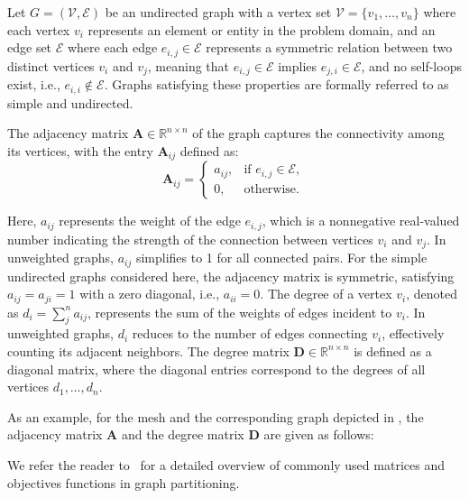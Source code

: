     Let $G=(\mathcal{V}, \mathcal{E})$ be an undirected graph with a vertex set 
    $\mathcal{V}=\{ v_1, \dots, v_n \}$ where each vertex $v_i$ represents
    an element or entity in the problem domain, and an edge set $\mathcal{E}$
    where each edge $e_{i, j} \in \mathcal{E}$ represents a symmetric relation between
    two distinct vertices $v_i$ and $v_j$, meaning that
    $e_{i, j} \in \mathcal{E}$ implies $e_{j, i} \in \mathcal{E}$, and no self-loops exist, i.e., $e_{i, i} \notin \mathcal{E}$. Graphs satisfying these properties are formally referred to as simple and undirected.
    
    The adjacency matrix $\mathbf{A} \in \mathbb{R}^{n \times n}$ of the graph
    captures the connectivity among its vertices, with the entry
    $\mathbf{A}_{ij}$ defined as:
    \begin{equation}
      \mathbf{A}_{ij} =
        \begin{cases}
            a_{ij}, & \text{if } e_{i,j} \in \mathcal{E},\\
            0, & \text{otherwise}.
        \end{cases}
    \end{equation}
    
    Here, $a_{ij}$ represents the weight of the edge $e_{i,j}$, which is a nonnegative real-valued number indicating the strength of the connection
    between vertices $v_i$ and $v_j$. In unweighted graphs, $a_{ij}$ simplifies to 1 for all connected pairs.
    For the simple undirected graphs considered here, the adjacency matrix is symmetric, satisfying $a_{ij} = a_{ji} = 1$ with a zero diagonal, i.e., $a_{ii} = 0$.
    The degree of a vertex $v_i$, denoted as $d_i = \sum^n_j a_{ij}$, represents the sum of the weights of edges incident to $v_i$. In unweighted graphs, $d_i$ reduces to the number of edges connecting $v_i$, effectively counting its adjacent
    neighbors. The degree matrix $\mathbf{D} \in \mathbb{R}^{n \times n}$ is defined
    as a diagonal matrix, where the diagonal entries correspond to the degrees of all vertices $d_1, \dots, d_n$.
    
    As an example, for the mesh and the corresponding graph depicted in , the adjacency matrix $\mathbf{A}$ and the degree matrix $\mathbf{D}$ are given as follows:
    
    \vspace{5mm}
    
    
    
    \vspace{5mm}
    
    We refer the reader to~\cite{doi:https://doi.org/10.1002/9781118601181.ch1} for a detailed overview of commonly used matrices and objectives functions in graph partitioning.
% 
